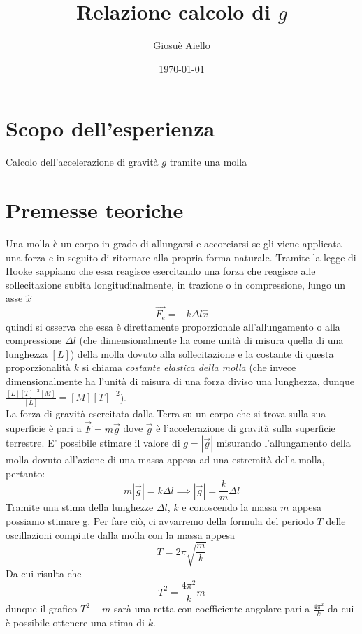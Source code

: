 \documentclass{article}
\title{Relazione calcolo di $g$}
\author{Giosuè Aiello}
\date{\today}
\begin{document}
	\maketitle
	\section{Scopo dell'esperienza}
	Calcolo dell'accelerazione di gravità $g$ tramite una molla
	\section{Premesse teoriche}
	Una molla è un corpo in grado di allungarsi e accorciarsi se gli viene applicata una forza e in seguito di ritornare alla propria forma naturale. Tramite la legge di Hooke sappiamo che essa reagisce esercitando una forza che reagisce alle sollecitazione subita longitudinalmente, in trazione o in compressione, lungo un asse $\hat{x}$
	\begin{equation}
	\vec{F_e} = - k \Delta l \hat{x}
	\end{equation}
	quindi si osserva che essa è direttamente proporzionale all'allungamento o alla compressione $\Delta l$ (che dimensionalmente ha come unità di misura quella di una lunghezza $[L]$) della molla dovuto alla sollecitazione e la costante di questa proporzionalità $k$ si chiama \emph{costante elastica della molla} (che invece dimensionalmente ha l'unità di misura di una forza diviso una lunghezza, dunque $\frac{[L][T]^{-2}[M]}{[L]} = [M][T]^{-2}$). \\
	La forza di gravità esercitata dalla Terra su un corpo che si trova sulla sua superficie è pari a
	$\vec{F} = m\vec{g}$
	dove $\vec{g}$ è l'accelerazione di gravità sulla superficie terrestre. E' possibile stimare il valore di $g=|\vec{g}|$ misurando l'allungamento della molla dovuto all'azione di una massa appesa ad una estremità della molla, pertanto:
	\begin{equation}
		m|\vec{g}| = k \Delta l \implies |\vec{g}| = \frac{k}{m} \Delta l
		\label{secondo_modello}
	\end{equation}
	Tramite una stima della lunghezze $\Delta l$, $k$ e conoscendo la  massa $m$ appesa possiamo stimare g. Per fare ciò, ci avvarremo della formula del periodo $T$ delle oscillazioni compiute dalla molla con la massa appesa
	\begin{equation}
		T = 2 \pi \sqrt{\frac{m}{k}}
	\end{equation}
	Da cui risulta che 
	\begin{equation}
	T^2 = \frac{4\pi^2}{k} m
	\label{primo_modello}
	\end{equation}
	dunque il grafico $T^2 - m$ sarà una retta con coefficiente angolare pari a $\frac{4\pi^2}{k}$ da cui è possibile ottenere una stima di $k$.
\end{document}
